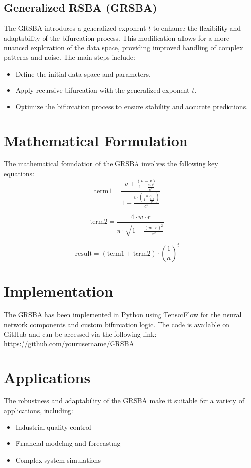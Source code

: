 \documentclass{article}
\begin{document}
\subsection{Generalized RSBA (GRSBA)}
The GRSBA introduces a generalized exponent \( t \) to enhance the flexibility and adaptability of the bifurcation process. This modification allows for a more nuanced exploration of the data space, providing improved handling of complex patterns and noise. The main steps include:
\begin{itemize}
    \item Define the initial data space and parameters.
    \item Apply recursive bifurcation with the generalized exponent \( t \).
    \item Optimize the bifurcation process to ensure stability and accurate predictions.
\end{itemize}

\section{Mathematical Formulation}
The mathematical foundation of the GRSBA involves the following key equations:
\begin{equation}
\text{term1} = \frac{v + \frac{(u - v)}{1 - \frac{u \cdot v}{c^2}}}{1 + \frac{v \cdot \left( \frac{u \cdot v}{1 - \frac{u \cdot v}{c^2}} \right)}{c^2}}
\end{equation}

\begin{equation}
\text{term2} = \frac{4 \cdot w \cdot r}{\pi \cdot \sqrt{1 - \frac{(w \cdot r)^2}{c^2}}}
\end{equation}

\begin{equation}
\text{result} = \left( \text{term1} + \text{term2} \right) \cdot \left( \frac{1}{a} \right)^{t}
\end{equation}

\section{Implementation}
The GRSBA has been implemented in Python using TensorFlow for the neural network components and custom bifurcation logic. The code is available on GitHub and can be accessed via the following link: \url{https://github.com/yourusername/GRSBA}

\section{Applications}
The robustness and adaptability of the GRSBA make it suitable for a variety of applications, including:
\begin{itemize}
    \item Industrial quality control
    \item Financial modeling and forecasting
    \item Complex system simulations
\end{itemize}
\end{document}
